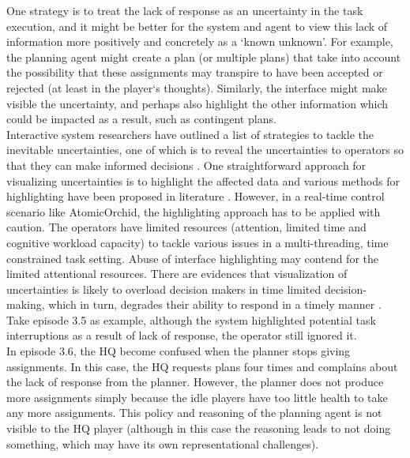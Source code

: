 One strategy is to treat the lack of response as an uncertainty in the task execution, and it might be better for the system and agent to view this lack of information more positively and concretely as a `known unknown'. For example, the planning agent might create a plan (or multiple plans) that take into account the possibility that these assignments may transpire to have been accepted or rejected (at least in the player`s thoughts). Similarly, the interface might make visible the uncertainty, and perhaps also highlight the other information which could be impacted as a result, such as contingent plans. \\

Interactive system researchers have outlined a list of strategies to tackle the inevitable uncertainties, one of which is to reveal the uncertainties to operators so that they can make informed decisions \cite{Benford2006} \cite{Skeels2008}. One straightforward approach for visualizing uncertainties is to highlight the affected data and various methods for highlighting have been proposed in literature \cite{Conti2006}. However, in a real-time control scenario like AtomicOrchid, the highlighting approach has to be applied with caution.  The operators have limited resources (attention, limited time and cognitive workload capacity) to tackle various issues in a multi-threading, time constrained task setting. Abuse of interface highlighting may contend for the limited attentional resources. There are evidences that visualization of uncertainties is likely to overload decision makers in time limited decision-making, which in turn, degrades their ability to respond in a timely manner \cite{Zuk2007}. Take episode 3.5 as example, although the system highlighted potential task interruptions as a result of lack of response, the operator still ignored it. \\

In episode 3.6, the HQ  become confused when the planner stops giving assignments. In this case, the HQ requests plans four times and complains about the lack of response from the planner. However, the planner does not produce more assignments simply because the idle players have too little health to take any more assignments. This policy and reasoning of the planning agent is not visible to the HQ player (although in this case the reasoning leads to not doing something, which may have its own representational challenges). \\

